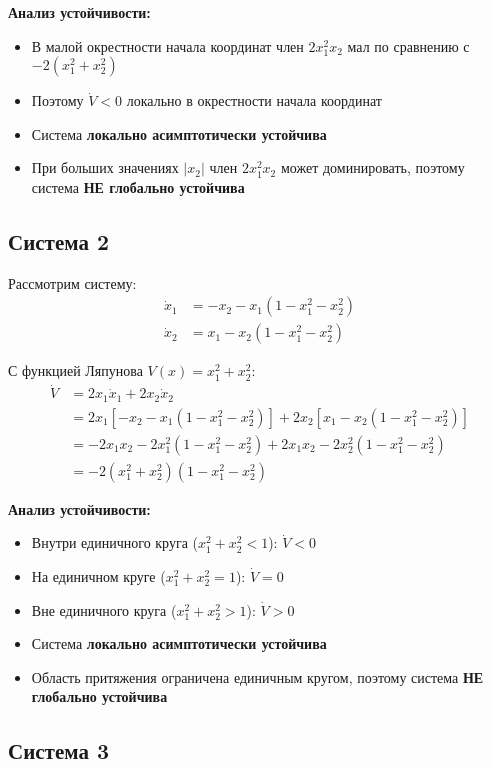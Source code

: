 \textbf{Анализ устойчивости:}
\begin{itemize}
\item В малой окрестности начала координат член $2x_1^2 x_2$ мал по сравнению с $-2(x_1^2 + x_2^2)$
\item Поэтому $\dot{V} < 0$ локально в окрестности начала координат
\item Система \textbf{локально асимптотически устойчива}
\item При больших значениях $|x_2|$ член $2x_1^2 x_2$ может доминировать, поэтому система \textbf{НЕ глобально устойчива}
\end{itemize}

\subsection{Система 2}

Рассмотрим систему:
\begin{align}
\dot{x}_1 &= -x_2 - x_1(1 - x_1^2 - x_2^2) \\
\dot{x}_2 &= x_1 - x_2(1 - x_1^2 - x_2^2)
\end{align}

С функцией Ляпунова $V(x) = x_1^2 + x_2^2$:
\begin{align}
\dot{V} &= 2x_1 \dot{x}_1 + 2x_2 \dot{x}_2 \\
&= 2x_1[-x_2 - x_1(1 - x_1^2 - x_2^2)] + 2x_2[x_1 - x_2(1 - x_1^2 - x_2^2)] \\
&= -2x_1 x_2 - 2x_1^2(1 - x_1^2 - x_2^2) + 2x_1 x_2 - 2x_2^2(1 - x_1^2 - x_2^2) \\
&= -2(x_1^2 + x_2^2)(1 - x_1^2 - x_2^2)
\end{align}

\textbf{Анализ устойчивости:}
\begin{itemize}
\item Внутри единичного круга ($x_1^2 + x_2^2 < 1$): $\dot{V} < 0$
\item На единичном круге ($x_1^2 + x_2^2 = 1$): $\dot{V} = 0$
\item Вне единичного круга ($x_1^2 + x_2^2 > 1$): $\dot{V} > 0$
\item Система \textbf{локально асимптотически устойчива}
\item Область притяжения ограничена единичным кругом, поэтому система \textbf{НЕ глобально устойчива}
\end{itemize}

\subsection{Система 3}

